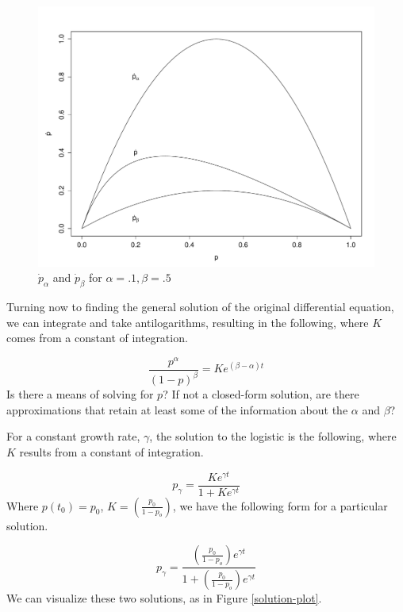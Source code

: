 \documentclass[11pt]{article}
\begin{document}
\begin{figure}
     \includegraphics[width=\textwidth]{logistic-plot}
\caption{$\dot{p}_\alpha$ and $\dot{p}_\beta$ for $\alpha=.1, \beta=.5$}
\label{logistic-plot}
\end{figure}


Turning now to finding the general solution of the original differential equation, we can integrate and take antilogarithms, resulting in the following, where $K$ comes from a constant of integration. 

\begin{equation}
 \frac{p^\alpha}{(1-p)^\beta} = Ke^{(\beta - \alpha)t}
\end{equation}
Is there a means of solving for $p$? If not a closed-form solution, are there approximations that retain at least some of the information about the $\alpha$ and $\beta$? 


For a constant growth rate, $\gamma$, the solution to the logistic is the following, where $K$ results from a constant of integration.

\begin{equation}
     p_\gamma = \frac{Ke^{\gamma t}}{1 + Ke^{\gamma t}}
\end{equation}
Where $p(t_0) = p_0$, $K = \left( \frac{p_0}{1-p_o} \right)$, we have the following form for a particular solution.

\begin{equation}
     p_\gamma = \frac{\left( \frac{p_0}{1-p_o} \right)e^{\gamma t}}{1 + \left( \frac{p_0}{1-p_o} \right)e^{\gamma t}}
\end{equation}
We can visualize these two solutions, as in Figure \ref{solution-plot}.
\end{document}
